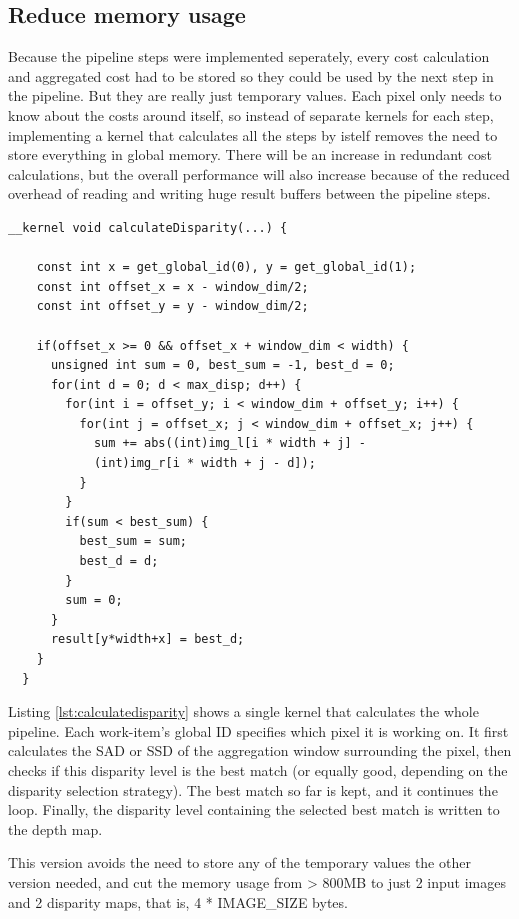 \subsection{Reduce memory usage}

Because the pipeline steps were implemented seperately, every cost
calculation and aggregated cost had to be stored so they could be used
by the next step in the pipeline. But they are really just temporary
values. Each pixel only needs to know about the costs around itself,
so instead of separate kernels for each step, implementing a kernel
that calculates all the steps by istelf removes the need to store
everything in global memory. There will be an increase in redundant
cost calculations, but the overall performance will also increase
because of the reduced overhead of reading and writing huge result
buffers between the pipeline steps.


\begin{lstlisting}[label={lst:calculatedisparity},caption=Single kernel to
  calculate the whole pipeline]
  __kernel void calculateDisparity(...) {

    const int x = get_global_id(0), y = get_global_id(1);
    const int offset_x = x - window_dim/2;
    const int offset_y = y - window_dim/2;

    if(offset_x >= 0 && offset_x + window_dim < width) {
      unsigned int sum = 0, best_sum = -1, best_d = 0;
      for(int d = 0; d < max_disp; d++) {
        for(int i = offset_y; i < window_dim + offset_y; i++) {
          for(int j = offset_x; j < window_dim + offset_x; j++) {
            sum += abs((int)img_l[i * width + j] -
            (int)img_r[i * width + j - d]);
          }
        }
        if(sum < best_sum) {
          best_sum = sum;
          best_d = d;
        }
        sum = 0;
      }
      result[y*width+x] = best_d;
    }
  }
\end{lstlisting}

Listing \ref{lst:calculatedisparity} shows a single kernel that
calculates the whole pipeline. Each work-item's global ID specifies
which pixel it is working on. It first calculates the SAD or SSD of
the aggregation window surrounding the pixel, then checks if this
disparity level is the best match (or equally good, depending on the
disparity selection strategy). The best match so far is kept, and it
continues the loop. Finally, the disparity level containing the
selected best match is written to the depth map.

This version avoids the need to store any of the temporary values the
other version needed, and cut the memory usage from > 800MB to just 2
input images and 2 disparity maps, that is, 4 * IMAGE\_SIZE bytes.

